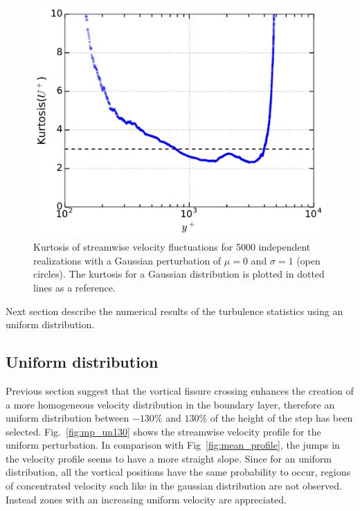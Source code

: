 \documentclass[aps,reprint,amsmath,amssymb,pra]{revtex4-1}%
\begin{document}
\begin{figure}[tb] 
\includegraphics[scale=0.46]{figures/kurtosis_5000_assembles_gauss100}
\caption{\label{fig:kurtgaus100} Kurtosis of streamwise velocity fluctuations for 5000 independent realizations with a Gaussian perturbation of $\mu=0$ and $\sigma=1$ (open circles). The kurtosis for a Gaussian distribution is plotted in dotted lines as a reference.}
\end{figure}
Next section describe the numerical results of the turbulence statistics using an uniform distribution.
\subsection{Uniform distribution}
Previous section suggest that the vortical fissure crossing enhances the creation of a more homogeneous velocity distribution in the boundary layer, therefore an uniform distribution between $-130\%$ and $130\%$ of the height of the step has been selected. Fig.~\ref{fig:mp_un130}  shows the streamwise velocity profile for the uniform perturbation. In comparison with Fig~\ref{fig:mean_profile}, the jumps in the velocity profile seems to have a more straight slope. Since for an uniform distribution, all the vortical positions have the same probability to occur, regions of concentrated velocity such like in the gaussian distribution are not observed. Instead zones with an increasing uniform velocity are appreciated.   
\end{document}
